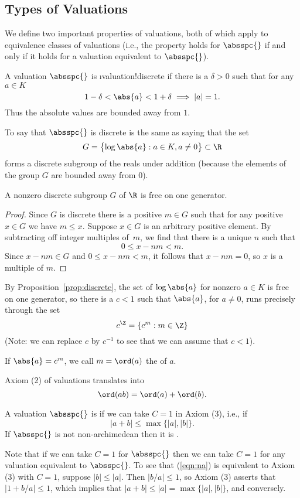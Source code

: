 \documentclass[11pt]{book}
\begin{document}
\begin{ch}
\section{Types of Valuations}
We define two important properties of valuations, both of which
apply to  equivalence classes of valuations (i.e., the property
holds for $\absspc{}$ if and only if it holds for a valuation
equivalent to $\absspc{}$).
\begin{definition}[Discrete]
A valuation $\absspc{}$ is \i{valuation!discrete}
if there is a $\delta>0$
such that for any $a\in K$
$$
   1-\delta < \abs{a} < 1+\delta \implies |a|=1.
$$
Thus the absolute values are bounded away from $1$.
\end{definition}
To say that $\absspc{}$ is discrete is the same as saying
that the set
$$G=\bigl\{
  \log\abs{a} : a \in K, a\neq 0
\bigr\} \subset \R
$$
forms a discrete subgroup of the reals under addition (because
the elements of the group $G$ are bounded away from $0$).
\begin{proposition}\label{prop:discrete}
A nonzero discrete subgroup $G$ of $\R$ is free on one generator.
\end{proposition}
\begin{proof}
Since $G$ is discrete there is a positive  $m\in G$
such that for any positive $x\in G$ we have $m\leq x$.
Suppose $x\in G$ is an arbitrary positive element.
By subtracting off integer multiples of~$m$, we
find that there is a unique $n$ such that
$$
   0\leq x-nm <m.
$$
Since $x-nm\in G$ and $0 \leq x-nm<m$, it follows
that $x-nm=0$, so $x$ is a multiple of $m$.
\end{proof}
By Proposition~\ref{prop:discrete}, the set
of $\log\abs{a}$ for nonzero $a\in K$
is free on one generator, so there
is a $c<1$ such that $\abs{a}$, for $a\neq 0$,
runs precisely through the set $$c^\Z = \{c^m : m\in \Z\}$$
(Note: we can replace $c$ by $c^{-1}$ to see that we
can assume that $c<1$).

\begin{definition}[Order]
If $\abs{a} = c^m$, we call $m=\ord(a)$ the 
of $a$.
\end{definition}
Axiom (2) of valuations
translates into
$$
  \ord(ab) = \ord(a) + \ord(b).
$$

\begin{definition}
A valuation $\absspc{}$ is 
if we can take $C=1$ in Axiom (3), i.e., if
\begin{equation}\label{eqn:na}
   |a + b| \leq \max\bigl\{|a|,|b|\bigr\}.
\end{equation}
If $\absspc{}$ is not non-archimedean then
it is .
\end{definition}
Note that if we can take $C=1$ for $\absspc{}$
then we can take $C=1$ for any valuation equivalent to
$\absspc{}$.
To see that (\ref{eqn:na}) is equivalent to Axiom (3) with
$C=1$, suppose $|b|\leq |a|$.  Then $|b/a|\leq 1$, so
Axiom (3) asserts that $|1+b/a|\leq 1$, which implies
that $|a+b| \leq |a| = \max\{|a|,|b|\}$, and conversely.


\end{ch}
\end{document}
